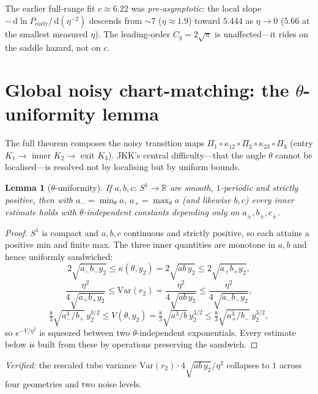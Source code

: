 \documentclass[11pt]{article}
\newtheorem{lemma}{Lemma}
\theoremstyle{remark}
\newcommand{\dd}{\,\mathrm{d}}
\newcommand{\Pearly}{P_{\mathrm{early}}}
\newcommand{\R}{\mathbb{R}}
\begin{document}
\noindent The earlier full-range fit $c\approx6.22$ was \emph{pre-asymptotic}: the
local slope $-\dd\ln\Pearly/\dd(\eta^{-2})$ descends from ${\sim}7$ ($\eta\approx1.9$)
toward $5.444$ as $\eta\to0$ ($5.66$ at the smallest measured $\eta$). The
leading-order $C_q=2\sqrt\pi$ is unaffected---it rides on the saddle hazard, not on
$c$.

\section{Global noisy chart-matching: the $\theta$-uniformity lemma}\label{sec:tube}

The full theorem composes the noisy transition maps
$\Pi_1\circ\kappa_{12}\circ\Pi_2\circ\kappa_{23}\circ\Pi_3$ (entry $K_1\to$ inner
$K_2\to$ exit $K_3$). JKK's central difficulty---that the angle $\theta$ cannot be
localised---is resolved not by localising but by uniform bounds.

\begin{lemma}[$\theta$-uniformity]\label{lem:theta}
If $a,b,c:\,S^1\to\R$ are smooth, $1$-periodic and strictly positive, then with
$a_-=\min_\theta a$, $a_+=\max_\theta a$ (and likewise $b,c$) every inner estimate
holds with $\theta$-independent constants depending only on $a_\pm,b_\pm,c_\pm$.
\end{lemma}

\begin{proof}
$S^1$ is compact and $a,b,c$ continuous and strictly positive, so each attains a
positive min and finite max. The three inner quantities are monotone in $a,b$ and hence
uniformly sandwiched:
\[
  2\sqrt{a_-b_-y_2}\le\kappa(\theta,y_2)=2\sqrt{a b\,y_2}\le2\sqrt{a_+b_+y_2},
\]
\[
  \frac{\eta^2}{4\sqrt{a_+b_+y_2}}\le\mathrm{Var}(r_2)=\frac{\eta^2}{4\sqrt{a b\,y_2}}\le\frac{\eta^2}{4\sqrt{a_-b_-y_2}},
\]
\[
  \tfrac83\sqrt{a_-^3/b_+}\,y_2^{3/2}\le V(\theta,y_2)=\tfrac83\sqrt{a^3/b}\,y_2^{3/2}\le\tfrac83\sqrt{a_+^3/b_-}\,y_2^{3/2},
\]
so $e^{-V/\eta^2}$ is squeezed between two $\theta$-independent exponentials. Every
estimate below is built from these by operations preserving the sandwich.
\end{proof}

\emph{Verified:} the rescaled tube variance $\mathrm{Var}(r_2)\cdot4\sqrt{ab\,y_2}/\eta^2$
collapses to $1$ across four geometries and two noise levels.
\end{document}
